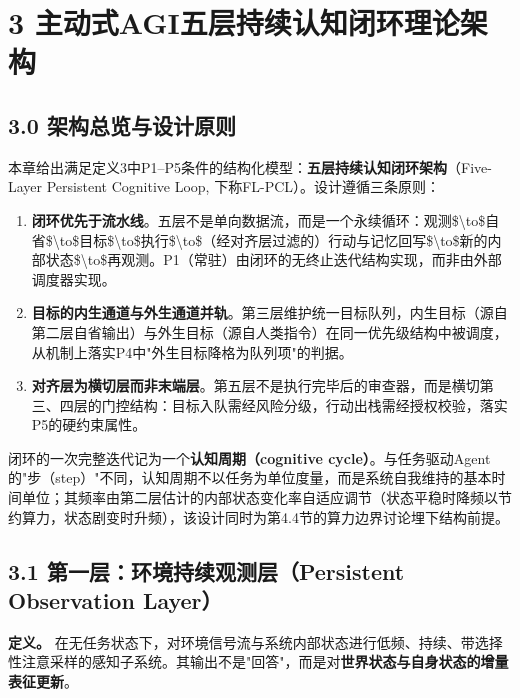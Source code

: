 \documentclass[11pt,a4paper]{ctexart}
\begin{document}
\section{3 主动式AGI五层持续认知闭环理论架构}

\subsection{3.0 架构总览与设计原则}

本章给出满足定义3中P1--P5条件的结构化模型：\textbf{五层持续认知闭环架构}（Five-Layer Persistent Cognitive Loop, 下称FL-PCL）。设计遵循三条原则：

\begin{enumerate}

  \item \textbf{闭环优先于流水线}。五层不是单向数据流，而是一个永续循环：观测\$\textbackslash{}to\$自省\$\textbackslash{}to\$目标\$\textbackslash{}to\$执行\$\textbackslash{}to\$（经对齐层过滤的）行动与记忆回写\$\textbackslash{}to\$新的内部状态\$\textbackslash{}to\$再观测。P1（常驻）由闭环的无终止迭代结构实现，而非由外部调度器实现。

  \item \textbf{目标的内生通道与外生通道并轨}。第三层维护统一目标队列，内生目标（源自第二层自省输出）与外生目标（源自人类指令）在同一优先级结构中被调度，从机制上落实P4中"外生目标降格为队列项"的判据。

  \item \textbf{对齐层为横切层而非末端层}。第五层不是执行完毕后的审查器，而是横切第三、四层的门控结构：目标入队需经风险分级，行动出栈需经授权校验，落实P5的硬约束属性。

\end{enumerate}

闭环的一次完整迭代记为一个\textbf{认知周期（cognitive cycle）}。与任务驱动Agent的"步（step）"不同，认知周期不以任务为单位度量，而是系统自我维持的基本时间单位；其频率由第二层估计的内部状态变化率自适应调节（状态平稳时降频以节约算力，状态剧变时升频），该设计同时为第4.4节的算力边界讨论埋下结构前提。

\subsection{3.1 第一层：环境持续观测层（Persistent Observation Layer）}

\textbf{定义。} 在无任务状态下，对环境信号流与系统内部状态进行低频、持续、带选择性注意采样的感知子系统。其输出不是"回答"，而是对\textbf{世界状态与自身状态的增量表征更新}。
\end{document}
